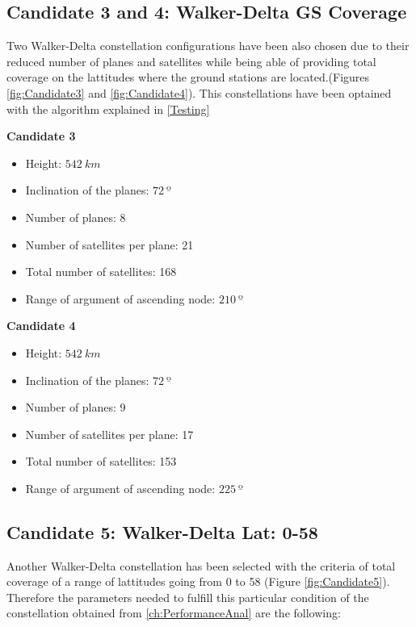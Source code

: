 \subsection{Candidate 3 and 4: Walker-Delta GS Coverage}

Two Walker-Delta constellation configurations have been also chosen due to their reduced number of planes and satellites while being able of providing total coverage on the lattitudes where the ground stations are located.(Figures \ref{fig:Candidate3} and \ref{fig:Candidate4}).
This constellations have been optained with the algorithm explained in \ref{Testing}

\textbf{Candidate 3}\\  
\begin{itemize}
\item Height: $542~{km}$ 
\item Inclination of the planes: $72~{º}$  
\item Number of planes: 8
\item Number of satellites per plane: 21
\item Total number of satellites: 168
\item Range of argument of ascending node: $210~{º}$ 
\end{itemize}

\textbf{Candidate 4}\\  
\begin{itemize}
\item Height: $542~{km}$ 
\item Inclination of the planes: $72~{º}$  
\item Number of planes: 9
\item Number of satellites per plane: 17
\item Total number of satellites: 153
\item Range of argument of ascending node: $225~{º}$
\end{itemize}

\subsection{Candidate 5: Walker-Delta Lat: 0-58}

Another Walker-Delta constellation has been selected with the criteria of total coverage of a range of lattitudes going from 0 to 58 (Figure \ref{fig:Candidate5}). Therefore the parameters needed to fulfill this particular condition of the constellation obtained from \ref{ch:PerformanceAnal} are the following:

